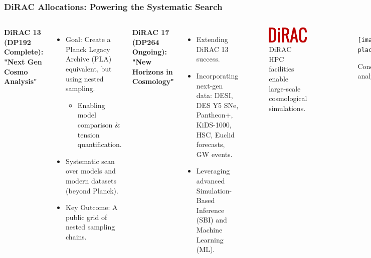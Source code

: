 \documentclass[aspectratio=169]{beamer}
\begin{document}
\begin{frame}
    \frametitle{DiRAC Allocations: Powering the Systematic Search}
    \begin{columns}[T]
        \textbf{DiRAC 13 (DP192 Complete): "Next Gen Cosmo Analysis"}
        \begin{itemize}
            \item Goal: Create a Planck Legacy Archive (PLA) equivalent, but using nested sampling.
                \begin{itemize}
                    \item Enabling model comparison \& tension quantification.
                \end{itemize}
            \item Systematic scan over models and modern datasets (beyond Planck).
            \item Key Outcome: A public grid of nested sampling chains.
        \end{itemize}
        \vspace{1em}
        \textbf{DiRAC 17 (DP264 Ongoing): "New Horizons in Cosmology"}
        \begin{itemize}
            \item Extending DiRAC 13 success.
            \item Incorporating next-gen data: DESI, DES Y5 SNe, Pantheon+, KiDS-1000, HSC, Euclid forecasts, GW events.
            \item Leveraging advanced Simulation-Based Inference (SBI) and Machine Learning (ML).
        \end{itemize}

        \begin{figure}
            \centering
            \includegraphics[width=0.8\columnwidth]{logos/dirac.png} %
            \caption{DiRAC HPC facilities enable large-scale cosmological simulations.}
        \end{figure}
        \begin{figure}
            \centering
            \texttt{[image: placeholder\_DIRAC\_GRID\_CONCEPT.png]}
            \caption{Conceptual view of the DiRAC-enabled analysis grid.}
        \end{figure}
    \end{columns}
\end{frame}
\end{document}
